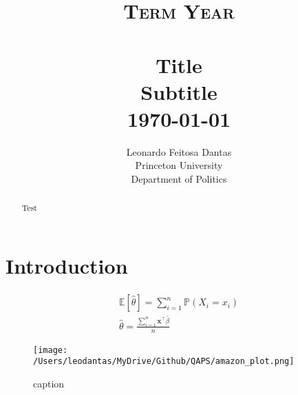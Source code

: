 \documentclass{article}[11pt]
\title{
			\large \textsc{Term Year}	
		 	\\[2.0cm]
			\HRule{1pt} \\			
			\LARGE \textbf{Title}\\
			Subtitle
			\HRule{1pt} \\ [0.5cm]
			\large \today
		}
\author{
		Leonardo Feitosa Dantas\\	
		Princeton University\\	
		Department of Politics\\
}
\makeatletter
\def\printtitle{%
    {\centering \@title\par}}
\def\printauthor{%
    {\centering \large \@author}}
\makeatother
\begin{document}
\thispagestyle{empty}		%

\printtitle					%
  	\vfill
\printauthor				%
\newpage
\clearpage

\begin{abstract}
Test
\end{abstract}
\clearpage

\section{Introduction}

\cite{Dantas_2023_ElectoralDiscourse, GrahamSvolik_2020_DemocracyAmerica} 

\begin{align*}
\mathbb{E}[\hat{﻿\theta}] = \sum_{i=1}^{n} \mathbb{P}(X_i = x_i)\\
\hat{﻿\theta} = \frac{\sum_{i=1}^{n} \mathbf{﻿x}^\top \bar{﻿\beta}}{n}
\end{align*}

\begin{figure}[H]
\caption{caption}
\texttt{[image: /Users/leodantas/MyDrive/Github/QAPS/amazon\_plot.png]}
\label{fig:label}
\end{figure}


\end{document}

